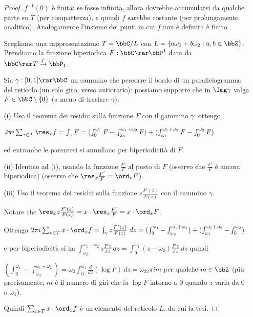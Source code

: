 \begin{proof}
$f^{-1}(0)$ è finita: se fosse infinita, allora dovrebbe accumularsi da qualche parte su $T$ (per compattezza), e quindi $f$ sarebbe costante (per prolungamento analitico).
Analogamente l'insieme dei punti in cui $f$ non è definita è finito.

Scegliamo una rappresentazione $T=\bbC/L$ con $L=\{a\omega_1+b\omega_2 : a,b\in\bbZ\}$. Prendiamo la funzione biperiodica $F:\bbC\rar\bbP^1$ data da $\bbC\rar T\xrightarrow{f}\bbP_1$.

Sia $\gamma:[0,1]\rar\bbC$ un cammino che percorre il bordo di un parallelogrammo del reticolo (un solo giro, verso antiorario):
possiamo supporre che in $\Img\gamma$ valga $F\in\bbC\setminus\{0\}$ (a meno di traslare $\gamma$).

(i) Uso il teorema dei residui sulla funzione $F$ con il gammino $\gamma$: ottengo

$2\pi i\sum_{x\in T}\res_xf=\int_\gamma F=(\int_0^{\omega_1}F-\int_{\omega_2}^{\omega_1+\omega_2}F)+(\int_{\omega_1}^{\omega_1+\omega_2}F-\int_{0}^{\omega_2}F)$

ed entrambe le parentesi si annullano per biperiodicità di $F$.


(ii) Identico ad (i), usando la funzione $\frac{F'}{F}$ al posto di $F$ (osservo che $\frac{F'}{F}$ è ancora biperiodica) (osservo che $\res_x\frac{F'}{F}=\ord_xF$).

(iii) Uso il teorema dei residui sulla funzione $z\frac{F'(z)}{F(z)}$ con il cammino $\gamma$.

Notare che $\res_xz\frac{F'(z)}{F(z)}=x\cdot\res_x\frac{F'}{F}=x\cdot\ord_xF$.

Ottengo $2\pi i\sum_{x\in T}x\cdot\ord_xf=\int_\gamma z\frac{F'(z)}{F(z)}\ dz=(\int_0^{\omega_1}-\int_{\omega_2}^{\omega_1+\omega_2})+(\int_{\omega_1}^{\omega_1+\omega_2}-\int_{0}^{\omega_2})$

e per biperiodicità si ha $\int_{\omega_2}^{\omega_1+\omega_2}z\frac{F'z}{Fz}\ dz=\int_0^{\omega_1}(z-\omega_2)\frac{F'z}{Fz}\ dz$ quindi

$(\int_0^{\omega_1}-\int_{\omega_2}^{\omega_1+\omega_2})=\omega_2\int_0^{\omega_1}\frac{d}{dz}(\log F)\ dz=\omega_22\pi i m$ per qualche $m\in\bbZ$
(più precisamente, $m$ è il numero di giri che fa $\log F$ intorno a $0$ quando $z$ varia da $0$ a $\omega_1$).

Quindi $\sum_{x\in T}x\cdot\ord_xf$ è un elemento del reticolo $L$, da cui la tesi.
\end{proof}


